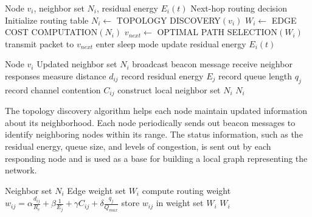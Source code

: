 \documentclass[a4paper,fleqn]{cas-dc}
\numberwithin{equation}{section}
\begin{document}
\begin{algorithm}[!ht]
\caption{Graph-Theoretic Adaptive Routing (GTAR)}
\label{alg:gtar}
\begin{algorithmic}[1]
\renewcommand{\algorithmicrequire}{\textbf{Require:}}
\renewcommand{\algorithmicensure}{\textbf{Ensure:}}
\REQUIRE Node $v_i$, neighbor set $N_i$, residual energy $E_i(t)$
\ENSURE Next-hop routing decision
\STATE Initialize routing table
\STATE $N_i \leftarrow$ TOPOLOGY DISCOVERY$(v_i)$
\STATE $W_i \leftarrow$ EDGE COST COMPUTATION$(N_i)$
\STATE $v_{next} \leftarrow$ OPTIMAL PATH SELECTION$(W_i)$
\STATE transmit packet to $v_{next}$
\ELSE
\STATE enter sleep mode
\ENDIF
\STATE update residual energy $E_i(t)$
\ENDWHILE
\end{algorithmic}
\end{algorithm}

\begin{algorithm}[!ht]
\caption{TOPOLOGY DISCOVERY$(v_i)$}
\label{alg:topology}
\begin{algorithmic}[1]
\renewcommand{\algorithmicrequire}{\textbf{Require:}}
\renewcommand{\algorithmicensure}{\textbf{Ensure:}}
\REQUIRE Node $v_i$
\ENSURE Updated neighbor set $N_i$
\STATE broadcast beacon message
\STATE receive neighbor responses
\STATE measure distance $d_{ij}$
\STATE record residual energy $E_j$
\STATE record queue length $q_j$
\STATE record channel contention $C_{ij}$
\ENDFOR
\STATE construct local neighbor set $N_i$
\RETURN $N_i$
\end{algorithmic}
\end{algorithm}

The topology discovery algorithm helps each node maintain updated information about its neighborhood. Each node periodically sends out beacon messages to identify neighboring nodes within its range. The status information, such as the residual energy, queue size, and levels of congestion, is sent out by each responding node and is used as a base for building a local graph representing the network.

\begin{algorithm}[!ht]
\caption{EDGE COST COMPUTATION$(N_i)$}
\label{alg:edgecost}
\begin{algorithmic}[1]
\renewcommand{\algorithmicrequire}{\textbf{Require:}}
\renewcommand{\algorithmicensure}{\textbf{Ensure:}}
\REQUIRE Neighbor set $N_i$
\ENSURE Edge weight set $W_i$
\STATE compute routing weight $w_{ij} = \alpha \frac{d_{ij}}{R_c} + \beta \frac{1}{E_j} + \gamma C_{ij} + \delta \frac{q_j}{Q_{max}}$
\STATE store $w_{ij}$ in weight set $W_i$
\ENDFOR
\RETURN $W_i$
\end{algorithmic}
\end{algorithm}
\end{document}
